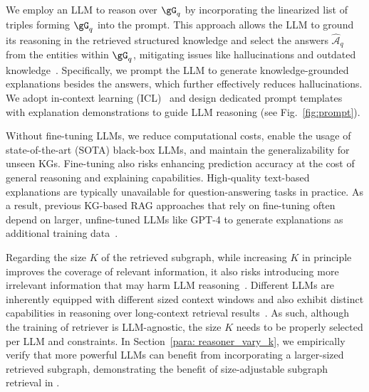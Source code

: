 We employ an LLM to reason over $\gG_q$ by incorporating the linearized list of triples forming $\gG_q$ into the prompt. This approach allows the LLM to ground its reasoning in the retrieved structured knowledge and select the answers $\hat{\mathcal{A}}_{q}$ from the entities within $\gG_q$, mitigating issues like hallucinations and outdated knowledge~\citep{lin2019kagnet, shuster-etal-2021-retrieval-augmentation, vu-etal-2024-freshllms}. Specifically, we prompt the LLM to generate knowledge-grounded explanations besides the answers, which further effectively reduces hallucinations. We adopt in-context learning (ICL)~\citep{NEURIPS2020_1457c0d6}  and design dedicated prompt templates with explanation demonstrations to guide LLM reasoning (see Fig.~\ref{fig:prompt}).

Without fine-tuning LLMs, we reduce computational costs, enable the usage of state-of-the-art (SOTA) black-box LLMs, and maintain the generalizability for unseen KGs. Fine-tuning also risks enhancing prediction accuracy at the cost of general reasoning and explaining capabilities. High-quality text-based explanations are typically unavailable for question-answering tasks in practice. As a result, previous KG-based RAG approaches that rely on fine-tuning often depend on larger, unfine-tuned LLMs like GPT-4 to generate explanations as additional training data~\citep{luo2024rog}.

Regarding the size $K$ of the retrieved subgraph, while increasing $K$ in principle improves the coverage of relevant information, it also risks introducing more irrelevant information that may harm LLM reasoning~\citep{xu2024retrieval, liu-etal-2024-lost}. Different LLMs are inherently equipped with different sized context windows and also exhibit distinct capabilities in reasoning over long-context retrieval results~\citep{dubey2024llama3herdmodels}. As such, although the training of \proj retriever is LLM-agnostic, the size $K$ needs to be properly selected per LLM and constraints. In Section~\ref{para: reasoner_vary_k}, we empirically verify that more powerful LLMs can benefit from incorporating a larger-sized retrieved subgraph, demonstrating the benefit of size-adjustable subgraph retrieval in \proj.


